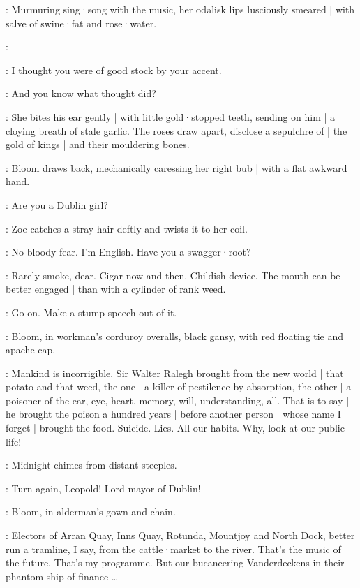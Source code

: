 :
Murmuring sing·song with the music,
her odalisk lips lusciously smeared |
with salve of swine·fat and rose·water.

\Zoe:

\Bloom:
I thought you were of good stock by your accent.

\Zoe:
And you know what thought did?

:
She bites his ear gently |
with little gold·stopped teeth,
sending on him |
a cloying breath of stale garlic.
The roses draw apart,
disclose a sepulchre of |
the gold of kings |
and their mouldering bones.

:
Bloom draws back,
mechanically caressing her right bub |
with a flat awkward hand.

\Bloom:
Are you a Dublin girl?

:
Zoe catches a stray hair deftly and twists it to her coil.

\Zoe:
No bloody fear.
I'm English.
Have you a swagger·root?

\Bloom:
Rarely smoke,
dear.
Cigar now and then.
Childish device.
The mouth can be better engaged |
than with a cylinder of rank weed.

\Zoe:
Go on.
Make a stump speech out of it.


\par

:
Bloom,
in workman's corduroy overalls,
black gansy,
with red floating tie and apache cap.

\Bloom:
Mankind is incorrigible.
Sir Walter Ralegh brought from the new world |
that potato and that weed,
the one |
a killer of pestilence by absorption,
the other |
a poisoner of the ear,
eye,
heart,
memory,
will,
understanding,
all.
That is to say |
he brought the poison a hundred years |
before another person |
whose name I forget |
brought the food.
Suicide.
Lies.
All our habits.
Why,
look at our public life!

:
Midnight chimes from distant steeples.

\Chimes:
Turn again,
Leopold!
Lord mayor of Dublin!

:
Bloom,
in alderman's gown and chain.

\Bloom:
Electors of Arran Quay,
Inns Quay,
Rotunda,
Mountjoy and North Dock,
better run a tramline,
I say,
from the cattle·market to the river.
That's the music of the future.
That's my programme.
But our bucaneering Vanderdeckens in their phantom ship of finance \ldots%

